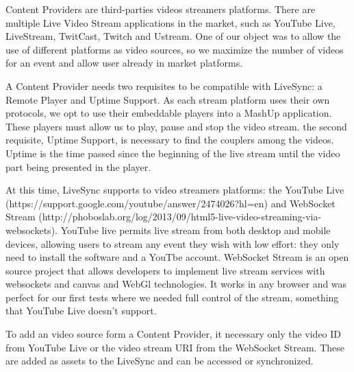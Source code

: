 Content Providers are third-parties videos streamers platforms. There are multiple Live Video Stream applications in the market, such as YouTube Live, LiveStream, TwitCast, Twitch and Ustream. One of our object was to allow the use of different platforms as video sources, so we maximize the number of videos for an event and allow user already in market platforms. 

A Content Provider needs two requisites to be compatible with LiveSync: a Remote Player and Uptime Support. As each stream platform uses their own protocols, we opt to use their embeddable players into a MashUp application. These players must allow us to play, pause and stop the video stream. the second requisite, Uptime Support, is necessary to find the couplers among the videos. Uptime is the time passed since the beginning of the live stream until the video part being presented in the player.

At this time, LiveSync supports to video streamers platforms: the YouTube Live (https://support.google.com/youtube/answer/2474026?hl=en) and WebSocket Stream (http://phoboslab.org/log/2013/09/html5-live-video-streaming-via-websockets). YouTube live permits live stream from both desktop and mobile devices, allowing users to stream any event they wish with low effort: they only need to install the software and a YouTbe account. WebSocket Stream is an open source project that allows developers to implement live stream services with websockets and canvas and WebGl technologies. It works in any browser and was perfect for our first tests where we needed full control of the stream, something that YouTube Live doesn't support.

To add an video source form a Content Provider, it necessary only the video ID from YouTube Live or the video stream URI from the WebSocket Stream. These are added as assets to the LiveSync and can be accessed or synchronized.